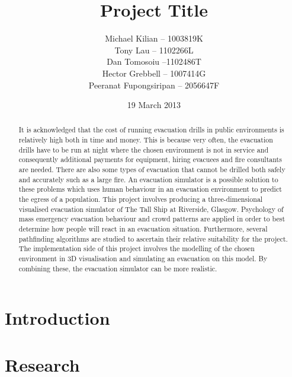 \documentclass{l3proj}
\begin{document}
\title{Project Title}
\author{Michael Kilian -- 1003819K \\
        Tony Lau -- 1102266L\\
        Dan Tomosoiu --1102486T \\
        Hector Grebbell -- 1007414G \\
        Peeranat Fupongsiripan -- 2056647F}
\date{19 March 2013}
\maketitle

\begin{abstract}
It is acknowledged that the cost of 
running evacuation drills in public environments is relatively high both in time and money. This is because very often, the 
evacuation drills have to be run at night where the chosen environment is not in service and consequently additional payments for 
equipment, hiring evacuees and fire consultants are needed.
There are also some types of evacuation that cannot be drilled both safely and accurately such as a large fire.
An evacuation simulator is a possible solution to these problems which uses human behaviour in an evacuation environment 
to predict the egress of a population. This project involves producing a three-dimensional visualised 
evacuation simulator of The Tall Ship at Riverside, Glasgow. Psychology of mass emergency evacuation behaviour and crowd patterns are applied in 
order to best determine how people will react in an evacuation situation. Furthermore, several pathfinding algorithms 
are studied to ascertain their relative suitability for the project.
The implementation side of this project 
involves the modelling of the chosen environment in 3D visualisation and simulating an evacuation on this model.
By combining these, the evacuation simulator can be more realistic.
\end{abstract}

\educationalconsent
\tableofcontents
\chapter{Introduction}
\label{introduction}




\chapter{Research}
\label{research}
\end{document}
